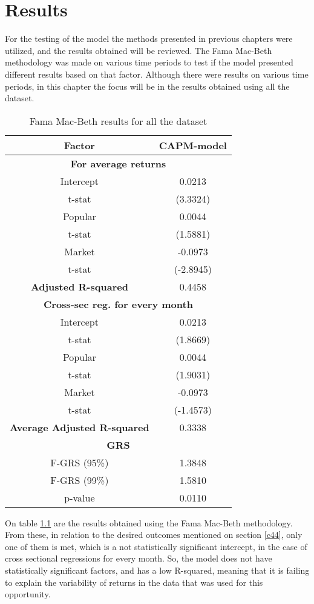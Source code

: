 \chapter{Results}
\label{c5}
For the testing of the model the methods presented in previous chapters were utilized, and the results obtained will be reviewed. The Fama Mac-Beth methodology was made on various time periods to test if the model presented different results based on that factor. Although there were results on various time periods, in this chapter the focus will be in the results obtained using all the dataset.
\begin{table}[h!]
	\centering
	\captionsetup{skip=0.5\baselineskip}
	\caption{Fama Mac-Beth results for all the dataset}
	\begin{tabular}{|c|c|}
		\hline
		\textbf{Factor} & \textbf{CAPM-model} \\ \hline
		\multicolumn{2}{|c|}{\textbf{For average returns}} \\ \hline
		Intercept & 0.0213 \\ 
		t-stat & (3.3324) \\ \hline
		Popular & 0.0044 \\ 
		t-stat & (1.5881)\\ \hline
		Market & -0.0973 \\
		t-stat & (-2.8945)\\ \hline
		\textbf{Adjusted R-squared} & 0.4458 \\ \hline
		\multicolumn{2}{|c|}{\textbf{Cross-sec reg. for every month}} \\ \hline
		Intercept & 0.0213 \\ 
		t-stat & (1.8669) \\ \hline
		Popular & 0.0044 \\ 
		t-stat & (1.9031)\\ \hline
		Market & -0.0973 \\
		t-stat & (-1.4573)\\ \hline
		\textbf{Average Adjusted R-squared} & 0.3338 \\ \hline
		\multicolumn{2}{|c|}{\textbf{GRS}} \\ \hline
		F-GRS (95\%) & 1.3848 \\ \hline
		F-GRS (99\%) & 1.5810 \\ \hline
		p-value & 0.0110 \\ \hline
	\end{tabular}
	\label{table: Results-all-data}
\end{table}

On table \ref{table: Results-all-data} are the results obtained using the Fama Mac-Beth methodology. From these, in relation to the desired outcomes mentioned on section \ref{c44}, only one of them is met, which is a not statistically significant intercept, in the case of cross sectional regressions for every month. So, the model does not have statistically significant factors, and has a low R-squared, meaning that it is failing to explain the variability of returns in the data that was used for this opportunity.

